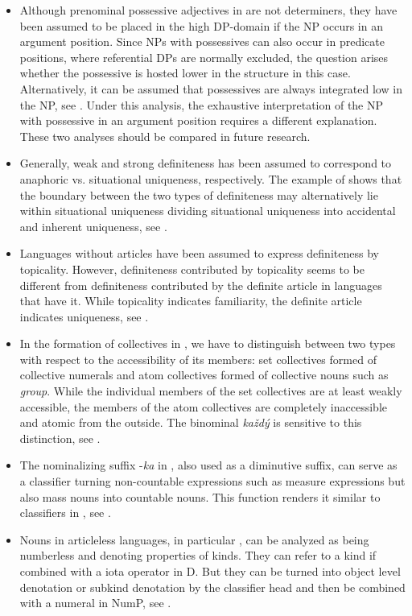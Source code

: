 \documentclass[output=paper]{langscibook}
\begin{document}
\begin{itemize}
    \item Although prenominal possessive adjectives in  are not determiners, they have been assumed to be placed in the high DP-domain if the NP occurs in an argument position. Since NPs with possessives can also occur in predicate positions, where referential DPs are normally excluded, the question arises whether the possessive is hosted lower in the structure in this case. Alternatively, it can be assumed that possessives are always integrated low in the NP, see . Under this analysis, the exhaustive interpretation of the NP with possessive in an argument position requires a different explanation. These two analyses should be compared in future research.
    \item Generally, weak and strong definiteness has been assumed to correspond to anaphoric vs. situational uniqueness, respectively. The example of  shows that the boundary between the two types of definiteness may alternatively lie within situational uniqueness dividing situational uniqueness into accidental and inherent uniqueness, see .
    \item Languages without articles have been assumed to express definiteness by topicality. However, definiteness contributed by topicality seems to be different from definiteness contributed by the definite article in languages that have it. While topicality indicates familiarity, the definite article indicates uniqueness, see  .
    \item In the formation of collectives in , we have to distinguish between two types with respect to the accessibility of its members: set collectives formed of collective numerals and atom collectives formed of collective nouns such as \textit{group}. While the individual members of the set collectives are at least weakly accessible, the members of the atom collectives are completely inaccessible and atomic from the outside. The binominal \textit{každý} is sensitive to this distinction, see .
    \item The nominalizing suffix -\textit{ka} in , also used as a diminutive suffix, can serve as a classifier turning non-countable expressions such as measure expressions but also mass nouns into countable nouns. This function renders it similar to classifiers in , see .
    \item Nouns in articleless  languages, in particular , can be analyzed as being numberless and denoting properties of kinds. They can refer to a kind if combined with a iota operator in D. But they can be turned into object level denotation or subkind denotation by the classifier head and then be combined with a numeral in NumP, see .
\end{itemize}
\end{document}
